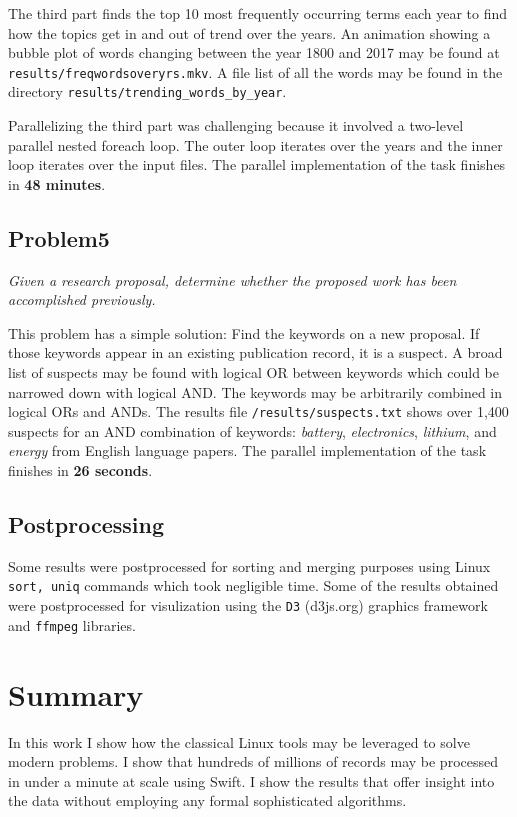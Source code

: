 \documentclass{article}
\begin{document}
The third part finds the top 10 most frequently occurring terms each year to
find how the topics get in and out of trend over the years. An animation
showing a bubble plot of words changing between the year 1800 and 2017 may be
found at \texttt{results/freqwordsoveryrs.mkv}. A file list of all the words
may be found in the directory \texttt{results/trending\_words\_by\_year}.

Parallelizing the third part was challenging because it involved a
two-level parallel nested foreach loop. The outer loop iterates over the years
and the inner loop iterates over the input files. The parallel implementation
of the task finishes in \textbf{48 minutes}.

\subsection*{Problem5}
\textit{Given a research proposal, determine whether the proposed work has been
accomplished previously.}

This problem has a simple solution: Find the keywords on a new proposal. If
those keywords appear in an existing publication record, it is a suspect. A
broad list of suspects may be found with logical OR between keywords which
could be narrowed down with logical AND. The keywords may be arbitrarily combined in
logical ORs and ANDs. The results file \texttt{/results/suspects.txt} shows
over 1,400 suspects for an AND combination of keywords:  \textit{battery},
\textit{electronics}, \textit{lithium}, and \textit{energy} from English
language papers. The parallel implementation of the task finishes in \textbf{26
seconds}.

\subsection*{Postprocessing}
Some results were postprocessed for sorting and merging purposes using Linux
\texttt{sort, uniq} commands which took negligible time. Some of the results
obtained were postprocessed for visulization using the \texttt{D3} (d3js.org)
graphics framework and \texttt{ffmpeg} libraries.


\section*{Summary}
In this work I show how the classical Linux tools may be leveraged to solve
modern problems. I show that hundreds of millions of records may be processed
in under a minute at scale using Swift. I show the results that offer insight
into the data without employing any formal sophisticated algorithms.
\end{document}

